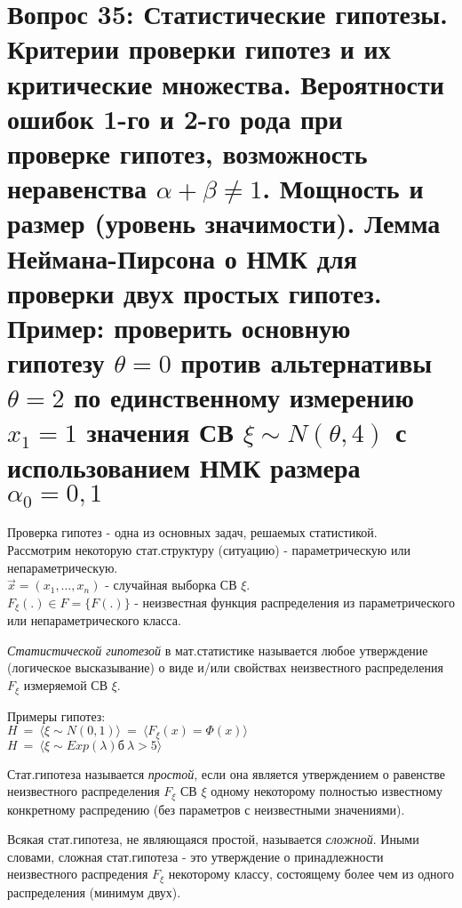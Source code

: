 \section{Вопрос 35:
Статистические гипотезы.
Критерии проверки гипотез и их критические множества.
Вероятности ошибок 1-го и 2-го рода при проверке гипотез, возможность неравенства $\alpha + \beta \neq 1$.
Мощность и размер (уровень значимости).
Лемма Неймана-Пирсона о НМК для проверки двух простых гипотез.
Пример: проверить основную гипотезу $\theta=0$ против альтернативы $\theta=2$ по
единственному измерению $x_1=1$ значения СВ $\xi \sim N(\theta,4)$ с использованием
НМК размера $\alpha_0=0,1$
}


Проверка гипотез - одна из основных задач, решаемых статистикой.\\
Рассмотрим некоторую стат.структуру (ситуацию) - параметрическую или непараметрическую.\\
$\overrightarrow{x}=(x_1,\ldots,x_n)$ - случайная выборка СВ $\xi$.\\
$F_{\xi}(.) \in F=\{F(.)\}$ - неизвестная функция распределения из параметрического
или непараметрического класса.

\begin{defs}
    \textit{Статистической гипотезой} в мат.статистике называется любое утверждение
    (логическое высказывание) о виде и/или свойствах неизвестного распределения $F_{\xi}$
    измеряемой СВ $\xi$.
\end{defs}

Примеры гипотез:\\
$H \ = \ \langle\xi\sim N(0,1)\rangle \ = \ \langle F_{\xi}(x) = \Phi(x)\rangle$\\
$H \ = \ \langle\xi\sim Exp(\lambda)б \ \lambda > 5\rangle$

\begin{defs}
    Стат.гипотеза называется \textit{простой}, если она является утверждением о равенстве
    неизвестного распределения $F_{\xi}$ СВ $\xi$ одному некоторому полностью известному
    конкретному распредению (без параметров с неизвестными значениями).
\end{defs}

\begin{defs}
    Всякая стат.гипотеза, не являющаяся простой, называется \textit{сложной}.
    Иными словами, сложная стат.гипотеза - это утверждение о принадлежности
    неизвестного распредения $F_{\xi}$ некоторому классу, состоящему
    более чем из одного распределения (минимум двух).
\end{defs}

